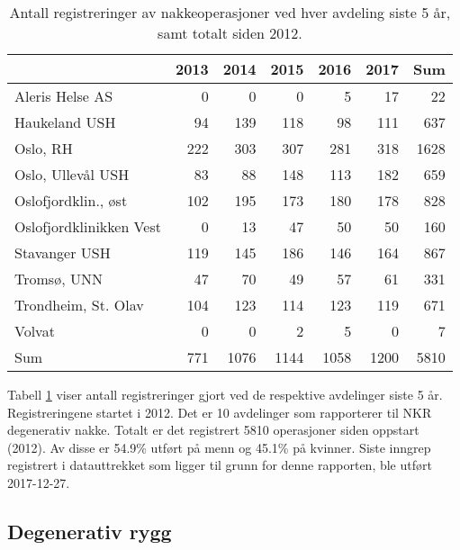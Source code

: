 \begin{table}[ht]
\centering
\begin{tabular}{lrrrrrr}
  \hline
 & 2013 & 2014 & 2015 & 2016 & 2017 & Sum \\ 
  \hline
Aleris Helse AS & 0 & 0 & 0 & 5 & 17 & 22 \\ 
  Haukeland USH & 94 & 139 & 118 & 98 & 111 & 637 \\ 
  Oslo, RH & 222 & 303 & 307 & 281 & 318 & 1628 \\ 
  Oslo, Ullevål USH & 83 & 88 & 148 & 113 & 182 & 659 \\ 
  Oslofjordklin., øst & 102 & 195 & 173 & 180 & 178 & 828 \\ 
  Oslofjordklinikken Vest & 0 & 13 & 47 & 50 & 50 & 160 \\ 
  Stavanger USH & 119 & 145 & 186 & 146 & 164 & 867 \\ 
  Tromsø, UNN & 47 & 70 & 49 & 57 & 61 & 331 \\ 
  Trondheim, St. Olav & 104 & 123 & 114 & 123 & 119 & 671 \\ 
  Volvat & 0 & 0 & 2 & 5 & 0 & 7 \\ 
  Sum & 771 & 1076 & 1144 & 1058 & 1200 & 5810 \\ 
   \hline
\end{tabular}
\caption{Antall registreringer av nakkeoperasjoner ved hver avdeling siste 5 år, samt totalt siden 2012.} 
\label{tab:AntRegNakke}
\end{table}



Tabell \ref{tab:AntRegNakke} viser antall 
registreringer gjort ved de respektive avdelinger siste 5 år. Registreringene startet i 2012. 
Det er  
10 avdelinger som rapporterer til NKR degenerativ nakke. Totalt er det registrert 5810 operasjoner siden oppstart (2012). Av disse er 54.9\% utført på menn og 45.1\% på kvinner.
Siste inngrep registrert i datauttrekket som ligger til grunn for denne rapporten, ble utført 
2017-12-27. 
\par




\subsection{Degenerativ rygg}

